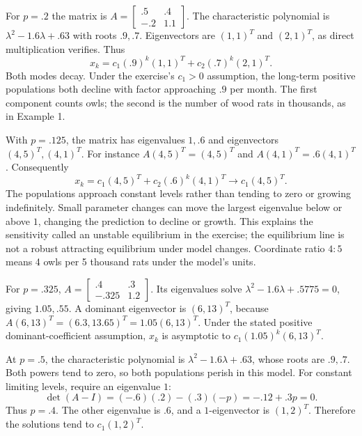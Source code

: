 For $p=.2$ the matrix is
$A=\begin{bmatrix}.5&.4\\-.2&1.1\end{bmatrix}$.
The characteristic polynomial is $\lambda^2-1.6\lambda+.63$
with roots $.9,.7$. Eigenvectors are $(1,1)^T$ and $(2,1)^T$,
as direct multiplication verifies. Thus
\[x_k=c_1(.9)^k(1,1)^T+c_2(.7)^k(2,1)^T.\]
Both modes decay. Under the exercise's $c_1>0$ assumption, the
long-term positive populations both decline with factor approaching
$.9$ per month. The first component counts owls; the second is the
number of wood rats in thousands, as in Example 1.

With $p=.125$, the matrix has eigenvalues $1,.6$ and eigenvectors
$(4,5)^T,(4,1)^T$. For instance
$A(4,5)^T=(4,5)^T$ and $A(4,1)^T=.6(4,1)^T$.
Consequently
\[x_k=c_1(4,5)^T+c_2(.6)^k(4,1)^T\longrightarrow c_1(4,5)^T.\]
The populations approach constant levels rather than tending to zero
or growing indefinitely. Small parameter changes can move the
largest eigenvalue below or above $1$, changing the prediction to
decline or growth. This explains the sensitivity called an unstable
equilibrium in the exercise; the equilibrium line is not a robust
attracting equilibrium under model changes. Coordinate ratio $4:5$
means 4 owls per 5 thousand rats under the model's units.

For $p=.325$, $A=\begin{bmatrix}.4&.3\\-.325&1.2\end{bmatrix}$.
Its eigenvalues solve $\lambda^2-1.6\lambda+.5775=0$, giving
$1.05,.55$. A dominant eigenvector is $(6,13)^T$, because
$A(6,13)^T=(6.3,13.65)^T=1.05(6,13)^T$.
Under the stated positive dominant-coefficient assumption,
$x_k$ is asymptotic to $c_1(1.05)^k(6,13)^T$.

At $p=.5$, the characteristic polynomial is
$\lambda^2-1.6\lambda+.63$, whose roots are $.9,.7$.
Both powers tend to zero, so both populations perish in this model.
For constant limiting levels, require an eigenvalue $1$:
\[\det(A-I)=(-.6)(.2)-(.3)(-p)=-.12+.3p=0.\]
Thus $p=.4$. The other eigenvalue is $.6$, and a $1$-eigenvector
is $(1,2)^T$. Therefore the solutions tend to $c_1(1,2)^T$.

